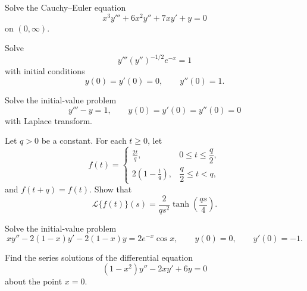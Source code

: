 \begin{problem}
Solve the Cauchy--Euler equation
\[
x^3y'''+6x^2y''+7xy'+y=0
\]
on $(0,\infty)$.
\end{problem}

\begin{problem}
Solve
\[
y'''(y'')^{-1/2}e^{-x}=1
\]
with initial conditions
\[
y(0)=y'(0)=0,
\qquad
y''(0)=1.
\]
\end{problem}

\begin{problem}
Solve the initial-value problem
\[
y'''-y=1,
\qquad
y(0)=y'(0)=y''(0)=0
\]
with Laplace transform.
\end{problem}

\begin{problem}
Let $q>0$ be a constant. For each $t\ge0$, let
\[
f(t)=
\begin{cases}
\displaystyle\frac{2t}{q}, & 0\le t\le\dfrac q2,\\[0.8em]
\displaystyle 2\left(1-\frac tq\right), & \dfrac q2\le t<q,
\end{cases}
\]
and $f(t+q)=f(t)$. Show that
\[
\mathcal{L}\{f(t)\}(s)
=\frac{2}{qs^2}\tanh\left(\frac{qs}{4}\right).
\]
\end{problem}

\begin{problem}
Solve the initial-value problem
\[
xy''-2(1-x)y'-2(1-x)y=2e^{-x}\cos x,
\qquad
y(0)=0,
\qquad
y'(0)=-1.
\]
\end{problem}

\begin{problem}
Find the series solutions of the differential equation
\[
(1-x^2)y''-2xy'+6y=0
\]
about the point $x=0$.
\end{problem}

